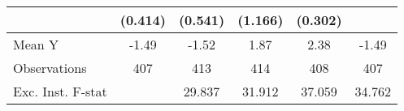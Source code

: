 {\begin{tabular}{l*{5}{c}}
            &     (0.414)         &     (0.541)         &     (1.166)         &     (0.302)         &                     \\
\midrule
Mean Y      &       -1.49         &       -1.52         &        1.87         &        2.38         &       -1.49         \\
Observations&         407         &         413         &         414         &         408         &         407         \\
Exc. Inst. F-stat&                     &      29.837         &      31.912         &      37.059         &      34.762         \\
\bottomrule
\end{tabular}
}
